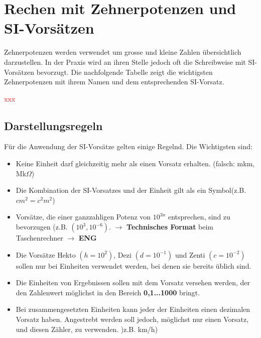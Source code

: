 \documentclass[11pt, a4paper, twoside, fleqn]{article}
\begin{document}
\section{Rechen mit Zehnerpotenzen und SI-Vorsätzen}
\begin{flushleft}
Zehnerpotenzen werden verwendet um grosse und kleine Zahlen übersichtlich darzustellen. In der Praxis wird an ihren Stelle jedoch oft die Schreibweise mit SI-Vorsätzen bevorzugt. Die nachfolgende Tabelle zeigt die wichtigsten Zehnerpotenzen mit ihrem Namen und dem entsprechenden SI-Vorsatz.
\end{flushleft}
\noindent \textcolor{red}{xxx}
\subsection{Darstellungsregeln}
\begin{flushleft}
Für die Anwendung der SI-Vorsätze gelten einige Regelnd. Die Wichtigsten sind:
\end{flushleft}
\begin{itemize}
\setlength{\itemsep}{0pt}
\item Keine Einheit darf gleichzeitig mehr als einen Vorsatz erhalten. (falsch: mkm, Mk\(\Omega\))
\item Die Kombination der SI-Vorsatzes und der Einheit gilt als ein Symbol(z.B. \(cm^2=c^2m^2\))
\item Vorsätze, die einer ganzzahligen Potenz von \(10^{3n}\) entsprechen, sind zu bevorzugen (z.B. \((10^3 , 10^{-6})\). $\rightarrow$ \textbf{Technisches Format} beim Taschenrechner $\rightarrow$ \textbf{ENG}
\item Die Vorsätze Hekto \((h = 10^2)\), Dezi \((d = 10^{-1})\) und Zenti \((c = 10^{-2})\) sollen nur bei Einheiten verwendet werden, bei denen sie bereits üblich sind.
\item Die Einheiten von Ergebnissen sollen mit dem Vorsatz versehen werden, der den Zahlenwert möglichst in den Bereich \textbf{0,1...1000} bringt.
\item Bei zusammengesetzten Einheiten kann jeder der Einheiten einen dezimalen Vorsatz haben. Angestrebt werden soll jedoch, möglichst nur einen Vorsatz, und diesen Zähler, zu verwenden. )z.B. km/h)
\end{itemize}
\newpage
\end{document}
